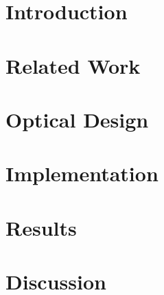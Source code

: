 \section{Introduction}
\label{sec:varifocal_occlusion:introduction}


\section{Related Work}
\label{sec:varifocal_occlusion:related}


\section{Optical Design}
\label{sec:varifocal_occlusion:design}


\section{Implementation}
\label{sec:varifocal_occlusion:implementation}


\section{Results}
\label{sec:varifocal_occlusion:results}


\section{Discussion}
\label{sec:varifocal_occlusion:discussion}


